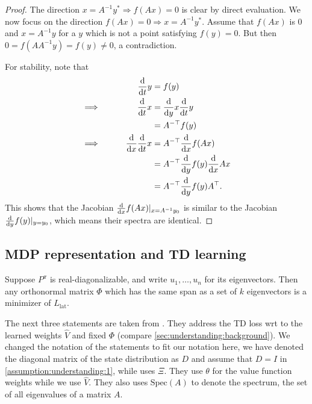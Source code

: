 \begin{proof}
The direction $x = A^{-1}y^* \Rightarrow f(Ax) = 0$ is clear by direct evaluation. We now focus on the direction $f(Ax) = 0 \Rightarrow x = A^{-1}y^*$. Assume that $f(Ax)$ is $0$ and $x = A^{-1}y$ for a $y$ which is not a point satisfying $f(y)=0$. But then $0 = f(AA^{-1}y) = f(y) \neq 0$, a contradiction.

For stability, note that
\begin{alignat*}{2}
    &\qquad&\frac{\mathrm{d}}{\mathrm{d} t} y & = f(y) \\
    \implies&&\frac{\mathrm{d}}{\mathrm{d} t} x & = \frac{\mathrm{d}}{\mathrm{d} y} x \frac{\mathrm{d}}{\mathrm{d} t} y\\
    && &= A^{-\top} f(y)\\
    \implies&& \frac{\mathrm{d}}{\mathrm{d} x} \frac{\mathrm{d}}{\mathrm{d} t} x &= A^{-\top} \frac{\mathrm{d}}{\mathrm{d} x} f(A x)\\
    && &= A^{-\top}  \frac{\mathrm{d}}{\mathrm{d} y} f(y) \frac{\mathrm{d}}{\mathrm{d} x} A x\\
    && &= A^{-\top}  \frac{\mathrm{d}}{\mathrm{d} y} f(y) A^\top.
\end{alignat*}
This shows that the Jacobian $\frac{\mathrm{d}}{\mathrm{d} x} f(Ax)|_{x=A^{-1}y_0}$ is similar to the Jacobian $\frac{\mathrm{d}}{\mathrm{d} y} f(y)|_{y=y_0}$, which means their spectra are identical.
\end{proof}


\subsection{MDP representation and TD learning}

\begin{lemma}\label{prop:TangResult2}
    Suppose $P^\pi$ is real-diagonalizable, and write $u_1,\dots, u_n$ for its eigenvectors. Then any orthonormal matrix $\Phi$ which has the same span as a set of $k$ eigenvectors is a minimizer of $L_{\text{lat}}$.
\end{lemma}


The next three statements are taken from \cite{ghosh2020representations}.  They address the TD loss wrt to the learned weights $\hat{V}$ and fixed $\Phi$ (compare \autoref{sec:understanding:background}).
We changed the notation of the statements to fit our notation here, we have denoted the diagonal matrix of the state distribution as $D$ and assume that $D=I$ in \autoref{assumption:understanding:1}, while \cite{ghosh2020representations} uses $\Xi$. They use $\theta$ for the value function weights while we use $\hat{V}$.
They also uses $\text{Spec}(A)$ to denote the spectrum, the set of all eigenvalues of a matrix $A$.

